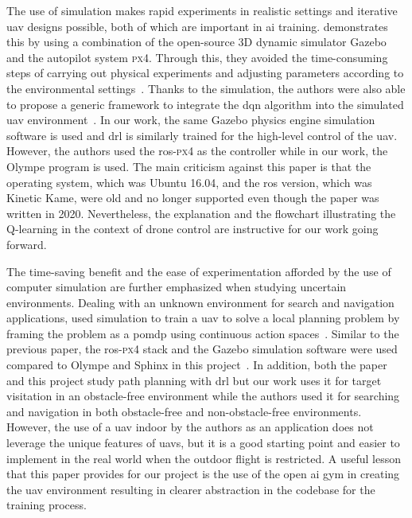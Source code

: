 \documentclass[../main.tex]{subfiles}
\begin{document}
The use of simulation makes rapid experiments in realistic settings 
and iterative \gls{uav} designs possible, 
both of which are important in \gls{ai} training. 
\citeauthor{Zho20} demonstrates this by %
using a combination of the open-source 3D dynamic simulator Gazebo
and the autopilot system \textsc{px4}.
Through this, they avoided the time-consuming steps of 
carrying out physical experiments
and adjusting parameters according 
to the environmental settings~\cite{Zho20}.
Thanks to the simulation, 
the authors were also able to propose a generic
framework to integrate the \gls{dqn} algorithm into 
the simulated \gls{uav} environment~\cite{Zho20}.
In our work, the same Gazebo physics engine
simulation software is used and \gls{drl} is similarly trained
for the high-level control of the \gls{uav}. 
However, the authors used the \gls{ros}-\textsc{px4} as the controller 
while in our work, the Olympe program is used.
The main criticism against this paper is that the operating system,
which was Ubuntu 16.04, and 
the \gls{ros} version, which was Kinetic Kame, 
were old and no longer supported 
even though the paper was written in 2020.
Nevertheless, the explanation and the flowchart illustrating the 
Q-learning in the context of drone control are instructive 
for our work going forward.

The time-saving benefit and the ease of experimentation 
afforded by the use of computer simulation are further emphasized 
when studying uncertain environments.
Dealing with an unknown environment for search and navigation applications,
\citeauthor{Wal19} used simulation to train a \gls{uav}
to solve a local planning problem
by framing the problem as 
a \gls{pomdp}
using continuous action spaces~\cite{Wal19}.
Similar to the previous paper, the \gls{ros}-\textsc{px4} stack 
and the Gazebo 
simulation software were used compared to Olympe and Sphinx 
in this project~\cite{Wal19}.
In addition, both the paper and this project study path planning 
with \gls{drl} but our work uses it for target visitation 
in an obstacle-free environment 
while the authors used it for searching and navigation
in both obstacle-free and non-obstacle-free environments.
However, the use of a \gls{uav} indoor by the authors as an application 
does not leverage the unique features of \glspl{uav}, 
but it is a good starting point 
and easier to implement in the real world 
when the outdoor flight is restricted.
A useful lesson that this paper provides for our project
is the use of the open \gls{ai} gym in creating the \gls{uav} environment
resulting in clearer abstraction in the codebase
for the training process.
\end{document}
